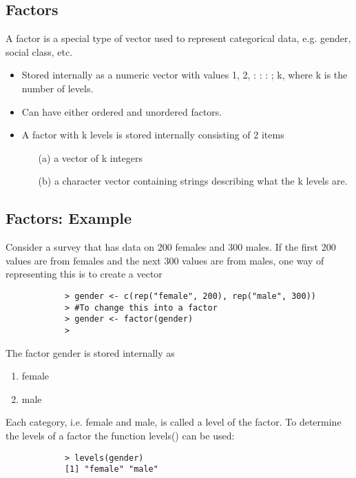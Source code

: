 \documentclass[a4paper,12pt]{article}
\begin{document}
\subsection*{Factors}
A factor is a special type of vector used to represent categorical
data, e.g. gender, social class, etc.
\begin{itemize}
	\item Stored internally as a numeric vector with values 1, 2, : : : ; k,
	where k is the number of levels.
	\item Can have either ordered and unordered factors.
	\item A factor with k levels is stored internally consisting of 2 items
	\begin{itemize}
		\item[(a)] a vector of k integers
		\item[(b)] a character vector containing strings describing what the k
		levels are.
	\end{itemize}
	\end{itemize}
	

		
		\subsection{Factors: Example}
		Consider a survey that has data on 200 females and 300 males. If
		the first 200 values are from females and the next 300 values are
		from males, one way of representing this is to create a vector
		\begin{framed}
			\begin{verbatim}
			> gender <- c(rep("female", 200), rep("male", 300))
			> #To change this into a factor
			> gender <- factor(gender)
			>
	\end{verbatim}
	\end{framed}	The factor gender is stored internally as
		\begin{enumerate}
	\item female
	\item male
		\end{enumerate}
	
		Each category, i.e. female and male, is called a level of the factor.
		To determine the levels of a factor the function levels() can be
		used:
		\begin{framed}
			\begin{verbatim}
			> levels(gender)
			[1] "female" "male"
			
	\end{verbatim}
	\end{framed}
	
\end{document}
